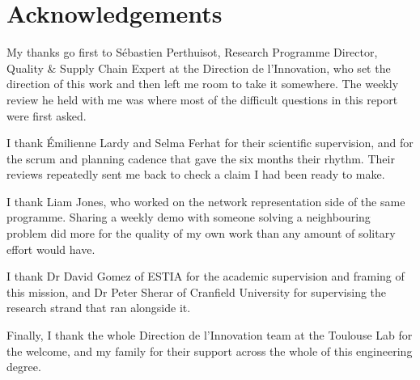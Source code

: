 \section*{Acknowledgements}
\label{sec:remerciements}

My thanks go first to S\'ebastien Perthuisot, Research Programme Director,
Quality \& Supply Chain Expert at the Direction de l'Innovation, who set the direction of
this work and then left me room to take it somewhere. The weekly
review he held with me was where most of the difficult questions in this report were first
asked.

I thank \'Emilienne Lardy and Selma Ferhat for their scientific supervision, and for the
scrum and planning cadence that gave the six months their rhythm. Their reviews repeatedly
sent me back to check a claim I had been ready to make.

I thank Liam Jones, who worked on the network representation side of the same
programme. Sharing a weekly demo with someone solving a neighbouring problem did more for
the quality of my own work than any amount of solitary effort would have.

I thank Dr David Gomez of ESTIA for the academic supervision and framing of this
mission, and Dr Peter Sherar of Cranfield University for supervising the research
strand that ran alongside it.

Finally, I thank the whole Direction de l'Innovation team at the Toulouse Lab for the
welcome, and my family for their support across the whole of this engineering degree.

